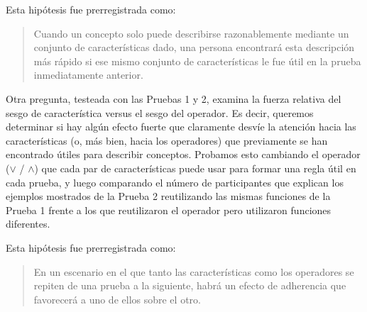 \begin{hyp}
Esta hipótesis fue prerregistrada como:
\begin{quote}
Cuando un concepto solo puede describirse razonablemente mediante un conjunto de características dado, una persona encontrará esta descripción más rápido si ese mismo conjunto de características le fue útil en la prueba inmediatamente anterior.
\end{quote}
\end{hyp}

\begin{hyp} \label{Hip:StickinessFeatureOperator}
Otra pregunta, testeada con las Pruebas 1 y 2, examina la fuerza relativa del sesgo de característica versus el sesgo del operador. Es decir, queremos determinar si hay algún efecto fuerte que claramente desvíe la atención hacia las características (o, más bien, hacia los operadores) que previamente se han encontrado útiles para describir conceptos. Probamos esto cambiando el operador ($ \lor $ / $ \land $) que cada par de características puede usar para formar una regla útil en cada prueba, y luego comparando el número de participantes que explican los ejemplos mostrados de la Prueba 2 reutilizando las mismas funciones de la Prueba 1 frente a los que reutilizaron el operador pero utilizaron funciones diferentes.

Esta hipótesis fue prerregistrada como:
\begin{quote}
En un escenario en el que tanto las características como los operadores se repiten de una prueba a la siguiente, habrá un efecto de adherencia que favorecerá a uno de ellos sobre el otro.
\end{quote}
\end{hyp}


